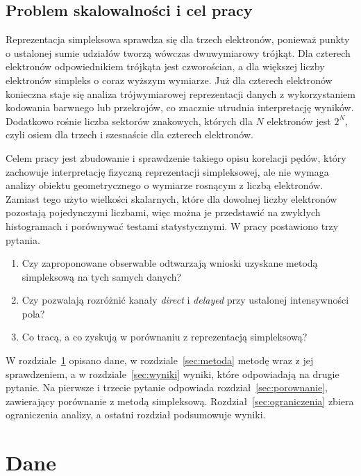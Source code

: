 \documentclass[12pt,a4paper]{article}
\begin{document}
\subsection{Problem skalowalności i cel pracy}

Reprezentacja simpleksowa sprawdza się dla trzech elektronów, ponieważ
punkty o ustalonej sumie udziałów tworzą wówczas dwuwymiarowy trójkąt.
Dla czterech elektronów odpowiednikiem trójkąta jest czworościan, a dla
większej liczby elektronów simpleks o coraz wyższym wymiarze. Już dla
czterech elektronów konieczna staje się analiza trójwymiarowej
reprezentacji danych z wykorzystaniem kodowania barwnego lub przekrojów,
co znacznie utrudnia interpretację wyników. Dodatkowo rośnie liczba
sektorów znakowych, których dla \(N\) elektronów jest \(2^{N}\), czyli
osiem dla trzech i szesnaście dla czterech elektronów.

Celem pracy jest zbudowanie i sprawdzenie takiego opisu korelacji
pędów, który zachowuje interpretację fizyczną reprezentacji
simpleksowej, ale nie wymaga analizy obiektu geometrycznego o wymiarze
rosnącym z liczbą elektronów. Zamiast tego użyto wielkości skalarnych,
które dla dowolnej liczby elektronów pozostają pojedynczymi liczbami,
więc można je przedstawić na zwykłych histogramach i porównywać testami
statystycznymi. W pracy postawiono trzy pytania.

\begin{enumerate}
  \item Czy zaproponowane obserwable odtwarzają wnioski uzyskane
        metodą simpleksową na tych samych danych?
  \item Czy pozwalają rozróżnić kanały \emph{direct} i
        \emph{delayed} przy ustalonej intensywności pola?
  \item Co tracą, a co zyskują w porównaniu z reprezentacją
        simpleksową?
\end{enumerate}

W rozdziale~\ref{sec:dane} opisano dane, w rozdziale~\ref{sec:metoda}
metodę wraz z jej sprawdzeniem, a w rozdziale~\ref{sec:wyniki} wyniki,
które odpowiadają na drugie pytanie. Na pierwsze i trzecie pytanie
odpowiada rozdział~\ref{sec:porownanie}, zawierający porównanie
z metodą simpleksową. Rozdział~\ref{sec:ograniczenia} zbiera
ograniczenia analizy, a ostatni rozdział podsumowuje wyniki.


\section{Dane}
\label{sec:dane}
\end{document}
